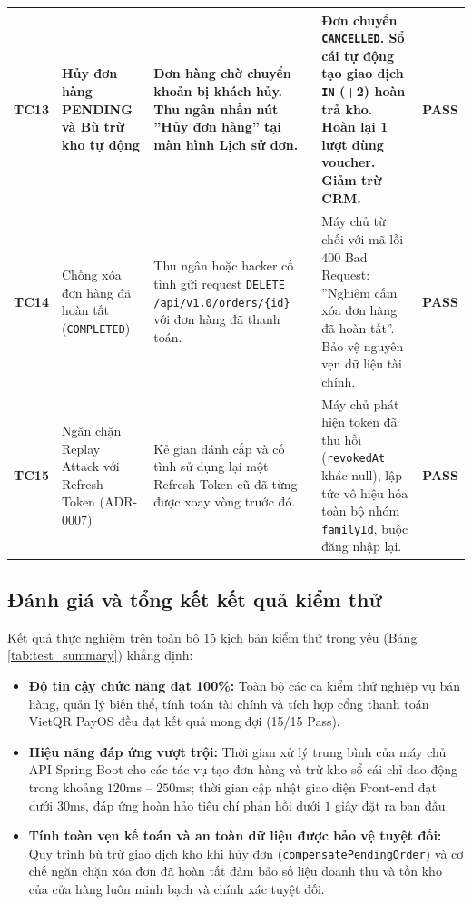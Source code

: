 \begin{longtable}{|c|p{3.2cm}|p{3.8cm}|p{4.2cm}|c|}
\textbf{TC13} & Hủy đơn hàng PENDING và Bù trừ kho tự động & Đơn hàng chờ chuyển khoản bị khách hủy. Thu ngân nhấn nút ''Hủy đơn hàng'' tại màn hình Lịch sử đơn. & Đơn chuyển \texttt{CANCELLED}. Sổ cái tự động tạo giao dịch \texttt{IN} (+2) hoàn trả kho. Hoàn lại 1 lượt dùng voucher. Giảm trừ CRM. & \textbf{PASS} \\ \hline

\textbf{TC14} & Chống xóa đơn hàng đã hoàn tất (\texttt{COMPLETED}) & Thu ngân hoặc hacker cố tình gửi request \texttt{DELETE /api/v1.0/orders/\{id\}} với đơn hàng đã thanh toán. & Máy chủ từ chối với mã lỗi 400 Bad Request: ''Nghiêm cấm xóa đơn hàng đã hoàn tất''. Bảo vệ nguyên vẹn dữ liệu tài chính. & \textbf{PASS} \\ \hline

\textbf{TC15} & Ngăn chặn Replay Attack với Refresh Token (ADR-0007) & Kẻ gian đánh cắp và cố tình sử dụng lại một Refresh Token cũ đã từng được xoay vòng trước đó. & Máy chủ phát hiện token đã thu hồi (\texttt{revokedAt} khác null), lập tức vô hiệu hóa toàn bộ nhóm \texttt{familyId}, buộc đăng nhập lại. & \textbf{PASS} \\
\end{longtable}

\subsection{Đánh giá và tổng kết kết quả kiểm thử}
Kết quả thực nghiệm trên toàn bộ 15 kịch bản kiểm thử trọng yếu (Bảng \ref{tab:test_summary}) khẳng định:
\begin{itemize}[leftmargin=1.5cm]
    \item \textbf{Độ tin cậy chức năng đạt 100\%:} Toàn bộ các ca kiểm thử nghiệp vụ bán hàng, quản lý biến thể, tính toán tài chính và tích hợp cổng thanh toán VietQR PayOS đều đạt kết quả mong đợi (15/15 Pass).
    \item \textbf{Hiệu năng đáp ứng vượt trội:} Thời gian xử lý trung bình của máy chủ API Spring Boot cho các tác vụ tạo đơn hàng và trừ kho sổ cái chỉ dao động trong khoảng $120$ms – $250$ms; thời gian cập nhật giao diện Front-end đạt dưới $30$ms, đáp ứng hoàn hảo tiêu chí phản hồi dưới $1$ giây đặt ra ban đầu.
    \item \textbf{Tính toàn vẹn kế toán và an toàn dữ liệu được bảo vệ tuyệt đối:} Quy trình bù trừ giao dịch kho khi hủy đơn (\texttt{compensatePendingOrder}) và cơ chế ngăn chặn xóa đơn đã hoàn tất đảm bảo số liệu doanh thu và tồn kho của cửa hàng luôn minh bạch và chính xác tuyệt đối.
\end{itemize}

